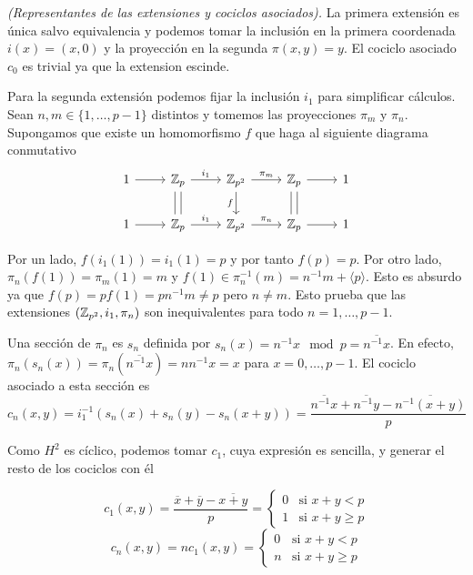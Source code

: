 \begin{ejercicio}
		\textit{(Representantes de las extensiones y cociclos asociados).} 
		La primera extensión es única salvo equivalencia y podemos tomar la inclusión en la primera coordenada $i(x) = (x,0)$ y la proyección en la segunda $\pi(x,y) = y$. El cociclo asociado $c_0$ es trivial ya que la extension escinde.
		
		Para la segunda extensión podemos fijar la inclusión $i_1$ para simplificar cálculos. Sean $n,m\in \{1,\ldots,p-1\}$ distintos y tomemos las proyecciones $\pi_m$ y $\pi_n$. Supongamos que existe un homomorfismo $f$ que haga al siguiente diagrama conmutativo
		\[\begin{tikzcd}
			1 & {\Z_p} & {\Z_{p^2}} & {\Z_p} & 1 \\
			1 & {\Z_p} & {\Z_{p^2}} & {\Z_p} & 1
			\arrow[from=1-1, to=1-2]
			\arrow["{i_1}", from=1-2, to=1-3]
			\arrow["{\pi_m}", from=1-3, to=1-4]
			\arrow[from=1-4, to=1-5]
			\arrow[from=2-1, to=2-2]
			\arrow["{i_1}", from=2-2, to=2-3]
			\arrow["{\pi_n}", from=2-3, to=2-4]
			\arrow[from=2-4, to=2-5]
			\arrow[shift left=1, no head, from=1-2, to=2-2]
			\arrow[shift left=1, no head, from=2-2, to=1-2]
			\arrow["f"', from=1-3, to=2-3]
			\arrow[shift left=1, no head, from=1-4, to=2-4]
			\arrow[shift left=1, no head, from=2-4, to=1-4]
		\end{tikzcd}\]

		Por un lado, $f(i_1(1)) = i_1(1) = p$ y por tanto $f(p)=p$. Por otro lado, $\pi_n(f(1)) = \pi_m(1) = m$ y $f(1)\in \pi_n^{-1}(m) = n^{-1}m + \langle p\rangle$. Esto es absurdo ya que $f(p) = pf(1) = pn^{-1}m \neq p$ pero $n\neq m$. Esto prueba que las extensiones $(\mathbb{Z}_{p^2},i_1,\pi_n)$ son inequivalentes para todo $n=1,\ldots,p-1$.
		
		Una sección de $\pi_n$ es $s_n$ definida por $s_n(x) = n^{-1}x \mod p = \overline{n^{-1}x}$. En efecto, $\pi_n(s_n(x)) = \pi_n(\overline{n^{-1}x}) = nn^{-1}x = x$ para $x=0,\ldots,p-1$.
		El cociclo asociado a esta sección es 
		\begin{equation*}
			c_n(x,y) = i_1^{-1}(s_n(x)+s_n(y)-s_n(x+y)) = \frac{\overline{n^{-1}x}+\overline{n^{-1}y}-\overline{n^{-1}(x+y)}}{p} %
		\end{equation*}
		
		Como $H^2$ es cíclico, podemos tomar $c_1$, cuya expresión es sencilla, y generar el resto de los cociclos con él
		
		\[
		    c_1(x,y) = \frac{\overline{x} + \overline{y} - \overline{x+y}}{p} =  \begin{cases}
		        0 & \text{si } x+y < p\\
		        1 & \text{si } x+y \geq p
		        \end{cases}
		\]
		\[
		    c_n(x,y) = nc_1(x,y) =  \begin{cases}
		        0 & \text{si } x+y < p\\
		        n & \text{si } x+y \geq p
		        \end{cases}
		\]

\end{ejercicio}


